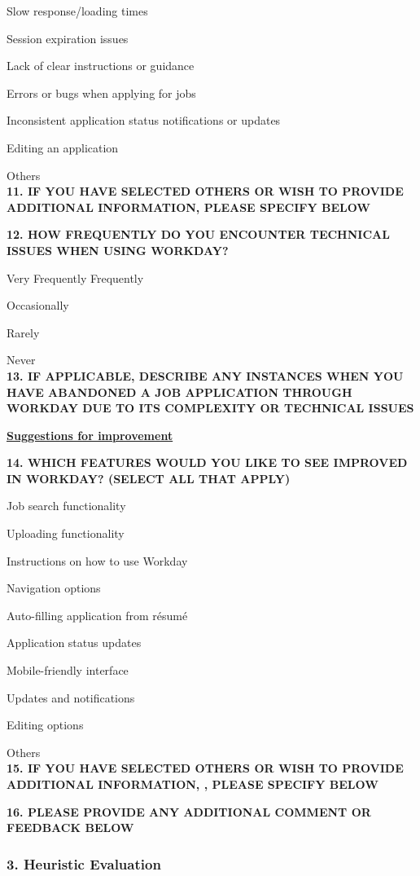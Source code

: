 \documentclass[
	letterpaper, %
]{jdf}
\begin{document}
\begin{sloppypar}
Slow response/loading times

Session expiration issues

Lack of clear instructions or guidance

Errors or bugs when applying for jobs

Inconsistent application status notifications or updates

Editing an application

Others \\

\textbf{11. IF YOU HAVE SELECTED OTHERS OR WISH TO PROVIDE ADDITIONAL INFORMATION, PLEASE SPECIFY BELOW} 

\textbf{12. HOW FREQUENTLY DO YOU ENCOUNTER TECHNICAL ISSUES WHEN USING WORKDAY? 
}

Very Frequently
Frequently

Occasionally

Rarely

Never \\

\textbf{13. IF APPLICABLE, DESCRIBE ANY INSTANCES WHEN YOU HAVE ABANDONED A JOB APPLICATION THROUGH WORKDAY DUE TO ITS COMPLEXITY OR TECHNICAL ISSUES 
}

\underline{\textbf{Suggestions for improvement }}

\textbf{14. WHICH FEATURES WOULD YOU LIKE TO SEE IMPROVED IN WORKDAY? (SELECT ALL THAT APPLY)
}

Job search functionality

Uploading functionality

Instructions on how to use Workday

Navigation options

Auto-filling application from résumé  

Application status updates 

Mobile-friendly interface

Updates and notifications

Editing options 

Others \\

\textbf{15. IF YOU HAVE SELECTED OTHERS OR WISH TO PROVIDE ADDITIONAL INFORMATION, , PLEASE SPECIFY BELOW}

\textbf{16. PLEASE PROVIDE ANY ADDITIONAL COMMENT OR FEEDBACK BELOW	
}
\hfill \break
\hfill \break
\subsubsection{3. Heuristic Evaluation}


\end{sloppypar}
\end{document}
